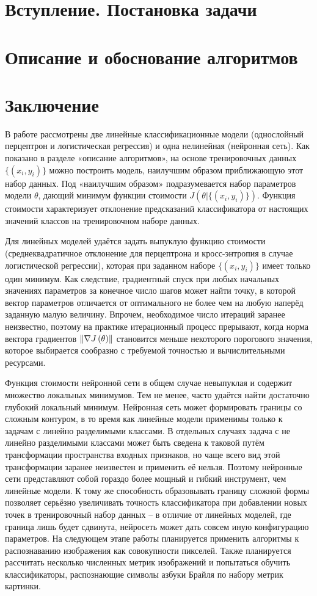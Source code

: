 \documentclass[main.tex]{subfiles}
\begin{document}
\section{Вступление. Постановка задачи}
\section{Описание и обоснование алгоритмов}

\newpage
\section{Заключение}
В работе рассмотрены две линейные классификационные модели (однослойный перцептрон и логистическая регрессия) и одна нелинейная (нейронная сеть). Как показано в разделе «описание алгоритмов», на основе тренировочных данных $\{(x_i,y_i)\}$ можно построить модель, наилучшим образом приближающую этот набор данных. Под «наилучшим образом» подразумевается набор параметров модели $\theta$, дающий минимум функции стоимости $J(\theta|\{(x_i,y_i)\})$. Функция стоимости характеризует отклонение предсказаний классификатора от настоящих значений классов на тренировочном наборе данных.

Для линейных моделей удаётся задать выпуклую функцию стоимости (среднеквадратичное отклонение для перцептрона и кросс-энтропия в случае логистической регрессии), которая при заданном наборе $\{(x_i,y_i)\}$ имеет только один минимум. Как следствие, градиентный спуск при любых начальных значениях параметров за конечное число шагов может найти точку, в которой вектор параметров отличается от оптимального не более чем на любую наперёд заданную малую величину. Впрочем, необходимое число итераций заранее неизвестно, поэтому на практике итерационный процесс прерывают, когда норма вектора градиентов $\left\lVert\nabla J\left(\theta\right)\right\rVert$ становится меньше некоторого порогового значения, которое выбирается сообразно с требуемой точностью и вычислительными ресурсами.

Функция стоимости нейронной сети в общем случае невыпуклая и содержит множество локальных минимумов. Тем не менее, часто удаётся найти достаточно глубокий локальный минимум. Нейронная сеть может формировать границы со сложным контуром, в то время как линейные модели применимы только к задачам с линейно разделимыми классами. В отдельных случаях задача с не линейно разделимыми классами может быть сведена к таковой путём трансформации пространства входных признаков, но чаще всего вид этой трансформации заранее неизвестен и применить её нельзя. Поэтому нейронные сети представляют собой гораздо более мощный и гибкий инструмент, чем линейные модели. К тому же способность образовывать границу сложной формы позволяет серьёзно увеличивать точность классификатора при добавлении новых точек в тренировочный набор данных – в отличие от линейных моделей, где граница лишь будет сдвинута, нейросеть может дать совсем иную конфигурацию параметров.
На следующем этапе работы планируется применить алгоритмы к распознаванию изображения как совокупности пикселей. Также планируется рассчитать несколько численных метрик изображений и попытаться обучить классификаторы, распознающие символы азбуки Брайля по набору метрик картинки.
\end{document}
